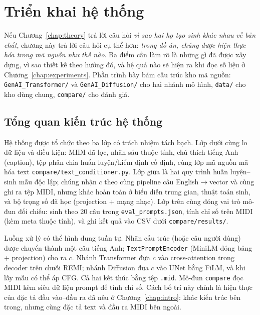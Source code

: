 \chapter{Triển khai hệ thống}
\label{chap:implementation}

Nếu Chương~\ref{chap:theory} trả lời câu hỏi \textit{vì sao hai họ tạo sinh khác nhau về bản chất}, chương này trả lời câu hỏi cụ thể hơn: \textit{trong đồ án, chúng được hiện thực hóa trong mã nguồn như thế nào}. Ba điểm cần làm rõ là những gì đã được xây dựng, vì sao thiết kế theo hướng đó, và hệ quả nào sẽ hiện ra khi đọc số liệu ở Chương~\ref{chap:experiments}. Phần trình bày bám cấu trúc kho mã nguồn: \texttt{GenAI\_Transformer/} và \texttt{GenAI\_Diffusion/} cho hai nhánh mô hình, \texttt{data/} cho kho dùng chung, \texttt{compare/} cho đánh giá.

\section{Tổng quan kiến trúc hệ thống}
\label{sec:ch3-overview}

Hệ thống được tổ chức theo ba lớp có trách nhiệm tách bạch. Lớp dưới cùng lo dữ liệu và điều kiện: MIDI đã lọc, nhãn sáu thuộc tính, chú thích tiếng Anh (caption), tệp phân chia huấn luyện/kiểm định cố định, cùng lớp mã nguồn mã hóa text \texttt{compare/text\_conditioner.py}. Lớp giữa là hai quy trình huấn luyện--sinh mẫu độc lập; chúng nhận $c$ theo cùng pipeline câu English$\rightarrow$vector và cùng ghi ra tệp MIDI, nhưng khác hoàn toàn ở biểu diễn trung gian, thuật toán sinh, và bộ trọng số đã học (projection + mạng nhạc). Lớp trên cùng đóng vai trò mô-đun đối chiếu: sinh theo 20 câu trong \texttt{eval\_prompts.json}, tính chỉ số trên MIDI (kèm meta thuộc tính), và ghi kết quả vào CSV dưới \texttt{compare/results/}.

Luồng xử lý có thể hình dung tuần tự. Nhãn cấu trúc (hoặc câu người dùng) được chuyển thành một câu tiếng Anh; \texttt{TextPromptEncoder} (MiniLM đóng băng + projection) cho ra $c$. Nhánh Transformer đưa $c$ vào cross-attention trong decoder trên chuỗi REMI; nhánh Diffusion đưa $c$ vào UNet bằng FiLM, và khi lấy mẫu có thể áp CFG. Cả hai kết thúc bằng tệp \texttt{.mid}. Mô-đun \texttt{compare} đọc MIDI kèm siêu dữ liệu prompt để tính chỉ số. Cách bố trí này chính là hiện thực của đặc tả đầu vào--đầu ra đã nêu ở Chương~\ref{chap:intro}: khác kiến trúc bên trong, nhưng cùng đặc tả text và đầu ra MIDI bên ngoài.

